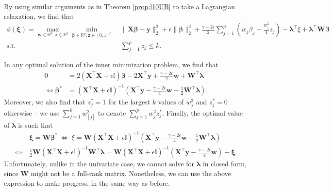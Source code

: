 \documentclass[opre,nonblindrev]{informs3} %
\begin{document}
{By using similar arguments as in Theorem \ref{prop:l10UB} to take a Lagrangian relaxation, we find that
\begin{align*}
	\phi(\bm{\xi})=\max_{\bm{w}\in \mathbb{R}^p,\lambda\in \mathbb{R}^q}\min_{\bm{\beta}\in \mathbb{R}^p,\bm{z}\in [0,1]^p}\;& \|\bm{X}\bm{\beta}-\bm{y}\|_2^2+\epsilon\|\bm{\beta}\|_2^2+\frac{\gamma-2\epsilon}{2}\sum_{j=1}^p \left(w_j\beta_j-\frac{w_j^2}{4}z_j\right)-\bm{\lambda}^\top\xi+\bm{\lambda}^\top \bm{W\beta}\\
	\text{s.t.}\;& \sum_{j=1}^p z_j\leq k.
\end{align*}


In any optimal solution of the inner minimization problem, we find that \begin{align*}0&=2(\bm{X}^\top \bm{X}+\epsilon\mathbb{I})\bm{\beta}-2\bm{X}^\top \bm{y}+\frac{\gamma-2\epsilon}{2}\bm{w}+\bm{W}^\top \bm{\lambda}\\
\Leftrightarrow\bm{\beta^*}&=\left(\bm{X}^\top \bm{X}+\epsilon\mathbb{I}\right)^{-1}\left(\bm{X}^\top \bm{y}-\frac{\gamma-2\epsilon}{4}\bm{w}-\frac{1}{2}\bm{W}^\top \bm{\lambda}\right).
\end{align*}
Moreover, we also find that $z_j^*=1$ for the largest $k$ values of $w_j^2$ and $z_j^*=0$ otherwise -- we use $\sum_{j=1}^k w_{[j]}^2$ to denote $\sum_{j=1}^p w_j^2z_j^*$. Finally, the optimal value of $\bm{\lambda}$ is such that 
\begin{align*}
&\bm{\xi}=\bm{\bm{W} \beta^*}\ \Leftrightarrow\; \xi=\bm{W}\left(\bm{X}^\top \bm{X}+\epsilon\mathbb{I}\right)^{-1}\left(\bm{X}^\top \bm{y}-\frac{\gamma-2\epsilon}{4}\bm{w}-\frac{1}{2}\bm{W}^\top \bm{\lambda}\right)\\
\Leftrightarrow\;& \frac{1}{2}\bm{W} \left(\bm{X}^\top \bm{X}+\epsilon\mathbb{I}\right)^{-1} \bm{W}^\top \bm{\lambda} = \bm{W}\left(\bm{X}^\top \bm{X}+\epsilon\mathbb{I}\right)^{-1}\left(\bm{X}^\top \bm{y}-\frac{\gamma-2\epsilon}{4}\bm{w}\right)-\bm{\xi}.
\end{align*}
Unfortunately, unlike in the univariate case, we cannot solve for $\bm{\lambda}$ in closed form, since $\bm{W}$ might not be a full-rank matrix. Nonetheless, we can use the above expression to make progress, in the same way as before. 

}
\end{document}
